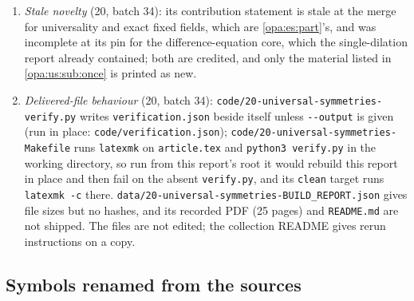 \documentclass[11pt,oneside]{article}
\numberwithin{equation}{section}
\theoremstyle{definition}
\theoremstyle{remark}
\newcommand{\lbl}[1]{\nolinkurl{#1}}
\newcommand{\fn}[1]{\nolinkurl{#1}}
\begin{document}
\begin{enumerate}[itemsep=2pt]
\cref{opa:of:part,opa:es:part,opa:hs:part}. Its description of the five guides it read, its credits of the lifts to \cite{KKS} and of the
centralizer to \lbl{saut:thm:axis}, and its KKS numbering are accurate. No mathematical error was found in 20 (\cref{opa:us:sub:status}).
\item \emph{Stale novelty} (20, batch 34): its contribution statement is stale at the merge for universality and exact fixed fields, which
are \cref{opa:es:part}'s, and was incomplete at its pin for the difference-equation core, which the single-dilation report already contained;
both are credited, and only the material listed in \cref{opa:us:sub:once} is printed as new.
\item \emph{Delivered-file behaviour} (20, batch 34): \fn{code/20-universal-symmetries-verify.py} writes \fn{verification.json} beside itself
unless \fn{--output} is given (run in place: \fn{code/verification.json}); \fn{code/20-universal-symmetries-Makefile} runs \fn{latexmk} on
\fn{article.tex} and \fn{python3 verify.py} in the working directory, so run from this report's root it would rebuild this report in place and then
fail on the absent \fn{verify.py}, and its \fn{clean} target runs \fn{latexmk -c} there. \fn{data/20-universal-symmetries-BUILD_REPORT.json} gives
file sizes but no hashes, and its recorded PDF (25 pages) and \fn{README.md} are not shipped. The files are not edited; the collection README gives
rerun instructions on a copy.
\end{enumerate}

\subsection{Symbols renamed from the sources}
\end{document}
